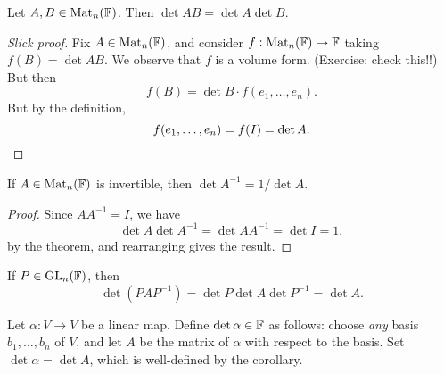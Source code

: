 \vspace{3pt}



\begin{theorem}
	Let $A,B\in\operatorname{Mat}_n(\mathbb{F})$. Then $\det AB=\det A \det B$. %
\end{theorem}

\begin{proof}
	[Slick proof] Fix $A\in\operatorname{Mat}_n(\mathbb{F})$, and consider $f:\operatorname{Mat}_n(\mathbb{F})\to\mathbb{F}$ taking $f(B) = \det AB$. We observe that $f$ is a volume form. (Exercise: check this!!) But then %
	\begin{equation*}
		f(B) = \det B \cdot f(e_1,\ldots,e_n).
	\end{equation*}
	But by the definition,
	\begin{equation*}
		f(e_1,\ldots,e_n) = f(I) = \det A. \qedhere
	\end{equation*}
\end{proof}

\begin{corollary}
	If $A\in\operatorname{Mat}_n(\mathbb{F})$ is invertible, then $\det A^{-1}=1/\det A$.
\end{corollary}
\vspace{-6pt}
\begin{proof}
	Since $AA^{-1}=I$, we have %
	\begin{equation*}
		\det A \det A^{-1} = \det {AA^{-1}} = \det I = 1,
	\end{equation*}
	by the theorem, and rearranging gives the result.
\end{proof}

\begin{corollary}
	If $P\in\operatorname{GL}_n(\mathbb{F})$, then
	\begin{equation*}
		\det(PAP^{-1})=\det P \det A \det P^{-1} = \det A.
	\end{equation*}
\end{corollary}
\vspace{-9pt}
\begin{definition}
	Let $\alpha:V\to V$ be a linear map. Define $\det\alpha\in\mathbb{F}$ as follows: choose \emph{any} basis $b_1,\ldots,b_n$ of $V$, and let $A$ be the matrix of $\alpha$ with respect to the basis. Set $\det\alpha=\det A$, which is well-defined by the corollary. %
\end{definition}
\vspace{3pt}

